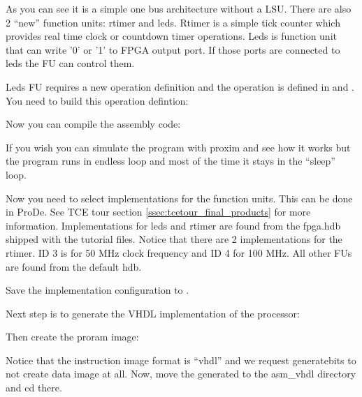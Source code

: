 \documentclass[twoside]{tceusermanual}
\begin{document}

As you can see it is a simple one bus architecture without a LSU. There are
also 2 ``new'' function units: rtimer and leds. Rtimer is a simple tick
counter which provides real time clock or countdown timer operations. Leds is
function unit that can write '0' or '1' to FPGA output port. If those ports
are connected to leds the FU can control them.

Leds FU requires a new operation definition and the operation is defined in
 and . You need to build this operation defintion:


Now you can compile the assembly code:


If you wish you can simulate the program with proxim and see how it works but
the program runs in endless loop and most of the time it stays in the
``sleep'' loop.

Now you need to select implementations for the function units. This can be
done in ProDe. See TCE tour section \ref{ssec:tcetour_final_products} for more
information. Implementations for leds and rtimer are found from the fpga.hdb
shipped with the tutorial files. Notice that there are 2 implementations for
the rtimer. ID 3 is for 50 MHz clock frequency and ID 4 for 100 MHz. All other
FUs are found from the default hdb.

Save the implementation configuration to .


Next step is to generate the VHDL implementation of the processor:



Then create the proram image:



Notice that the instruction image format is ``vhdl'' and we request
generatebits to not create data image at all. Now, move the generated 
 to the asm\_vhdl directory and cd there.
\end{document}
